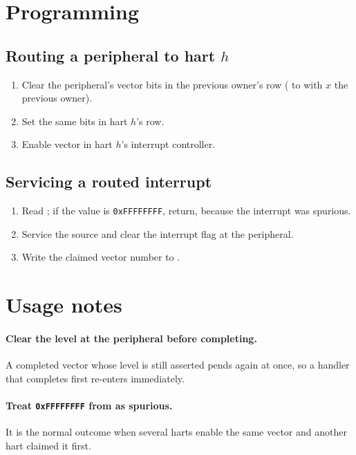 \section{Programming}

\subsection{Routing a peripheral to hart $h$}

\begin{enumerate}
	\item Clear the peripheral's vector bits in the previous owner's row ( to  with $x$ the previous owner).
	\item Set the same bits in hart $h$'s row.
	\item Enable vector \MeipVector{} in hart $h$'s interrupt controller.
\end{enumerate}

\subsection{Servicing a routed interrupt}

\begin{enumerate}
	\item Read ; if the value is \texttt{0xFFFFFFFF}, return, because the interrupt was spurious.
	\item Service the source and clear the interrupt flag at the peripheral.
	\item Write the claimed vector number to .
\end{enumerate}

\section{Usage notes}

\paragraph{Clear the level at the peripheral before completing.} A completed vector whose level is still asserted pends again at once, so a handler that completes first re-enters immediately.

\paragraph{Treat \texttt{0xFFFFFFFF} from  as spurious.} It is the normal outcome when several harts enable the same vector and another hart claimed it first.

